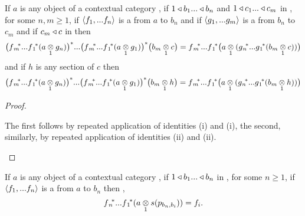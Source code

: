 \begin{lemma}
If $a$ is any object of a contextual category \catcw, if $1 \base b_1 ... \base b_n$ and $1 \base c_1 ... \base c_m$ in \catc, for some $n,m \ge 1$, 
if $\tuple{\fn}$ is a  from $a$ to $b_n$ and
if $\tuple{\gm}$ is a  from $b_n$ to $c_m$ and if  $c_m \base c$ in \catcw then
\begin{equation}
\label{cascadedpullbackscohereonobjects}
\big(\fmvectorstar (\crossx{a}{g_n}{1})\big)^* ... \big(\fmvectorstar (\crossx{a}{g_1}{1})\big) ^* \big(\crossx{b_m}{c}{1}\big) 
= \fmvectorstar \big(  \crossx{a}{(\gnvectorstar(\crossx{b_m}{c}{1}))}{1} \big)                                    
\end{equation}
and if  $h$ is any section of $c$ then 
\begin{equation}
\label{cascadedpullbackscohereonsections}
\big(\fmvectorstar (\crossx{a}{g_n}{1})\big)^* ... \big(\fmvectorstar (\crossx{a}{g_1}{1})\big) ^* \big(\crossx{b_m}{h}{1}\big) 
= \fmvectorstar \big(  \crossx{a}{(\gnvectorstar(\crossx{b_m}{h}{1}))}{1} \big)                                    
\end{equation}
\end{lemma}
\begin{proof}
\begin{oldtt}
The first follows by repeated application of identities  (i) and  (i), 
the second, similarly, by repeated application of identities  (ii) and  (ii).
\end{oldtt}
\end{proof}
\begin{lemma}
If $a$ is any object of a contextual category \catcw, if $1 \base b_1 ... \base b_n$ in \catc, for some $n \ge 1$, 
if $\tuple{\fn}$ is a  from $a$ to $b_n$ then \foreachi,
\begin{equation}
\fnvectorstar(\crossx{a}{s(p_{b_n,b_i})}{1})=f_i.                                    
\end{equation}
\end{lemma}